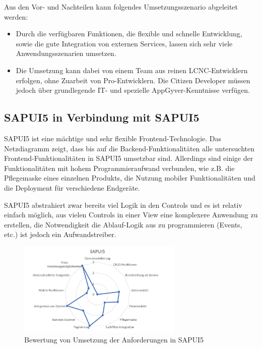 Aus den Vor- und Nachteilen kann folgendes Umsetzungsszenario abgeleitet werden:
\begin{itemize} 
  \item Durch die verfügbaren Funktionen, die flexible und schnelle Entwicklung, sowie die gute Integration von externen Services, lassen sich sehr viele Anwendungsszenarien umsetzen.
  \item Die Umsetzung kann dabei von einem Team aus reinen LCNC-Entwicklern erfolgen, ohne Zuarbeit von Pro-Entwicklern. Die Citizen Developer müssen jedoch über grundlegende IT- und spezielle AppGyver-Kenntnisse verfügen. 
\end{itemize}

\subsection{SAPUI5 in Verbindung mit SAPUI5}
SAPUI5 ist eine mächtige und sehr flexible Frontend-Technologie. Das Netzdiagramm zeigt, dass bis auf die Backend-Funktionalitäten alle untersuchten Frontend-Funktionalitäten in SAPUI5 umsetzbar sind. Allerdings  sind einige der Funktionalitäten mit hohem Programmieraufwand verbunden, wie z.B. die Pflegemaske eines einzelnen Produkts, die Nutzung mobiler Funktionalitäten und die Deployment für verschiedene Endgeräte.

SAPUI5 abstrahiert zwar bereits viel Logik in den Controls und es ist relativ einfach möglich, aus vielen Controls in einer View eine komplexere Anwendung zu erstellen, die Notwendigkeit die Ablauf-Logik aus zu programmieren (Events, etc.) ist jedoch ein Aufwandstreiber.
\begin{figure}[!htbp]
 \centering
 \includegraphics[width=0.7\textwidth]{Bilder/bewertung/ND_UI5.jpg}
 \caption{Bewertung von Umsetzung der Anforderungen in SAPUI5}
\end{figure}

